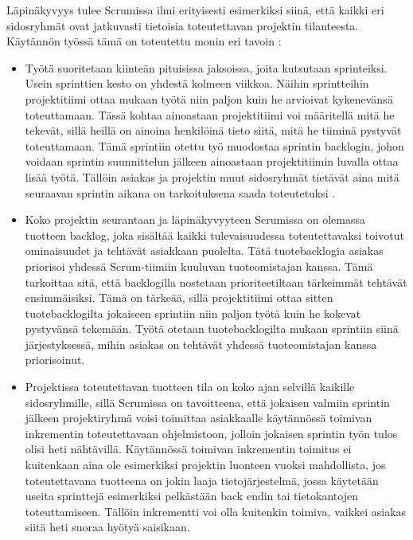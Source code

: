 \documentclass[finnish,nonumbib,nocopyright]{gradu2}
\begin{document}
Läpinäkyvyys tulee Scrumissa ilmi erityisesti esimerkiksi siinä, että kaikki eri sidosryhmät ovat jatkuvasti tietoisia toteutettavan projektin tilanteesta. Käytännön työssä tämä on toteutettu monin eri tavoin \cite{scrumguide}:

\begin{itemize}
\item Työtä suoritetaan kiinteän pituisissa jaksoissa, joita kutsutaan sprinteiksi. Usein sprinttien kesto on yhdestä kolmeen viikkoa. Näihin sprintteihin projektitiimi ottaa mukaan työtä niin paljon kuin he arvioivat kykenevänsä toteuttamaan. Tässä kohtaa ainoastaan projektitiimi voi määritellä mitä he tekevät, sillä heillä on ainoina henkilöinä tieto siitä, mitä he tiiminä pystyvät toteuttamaan. Tämä sprintiin otettu työ muodostaa sprintin backlogin, johon voidaan sprintin suunnittelun jälkeen ainoastaan projektitiimin luvalla ottaa lisää työtä. Tällöin asiakas ja projektin muut sidosryhmät tietävät aina mitä seuraavan sprintin aikana on tarkoituksena saada toteutetuksi \cite{scrumguide}.
\item Koko projektin seurantaan ja läpinäkyvyyteen Scrumissa on olemassa tuotteen backlog, joka sisältää kaikki tulevaisuudessa toteutettavaksi toivotut ominaisuudet ja tehtävät asiakkaan puolelta. Tätä tuotebacklogia asiakas priorisoi yhdessä Scrum-tiimiin kuuluvan tuoteomistajan kanssa. Tämä tarkoittaa sitä, että backlogilla nostetaan prioriteetiltaan tärkeimmät tehtävät ensimmäisiksi. Tämä on tärkeää, sillä projektitiimi ottaa sitten tuotebacklogilta jokaiseen sprintiin niin paljon työtä kuin he kokevat pystyvänsä tekemään. Työtä otetaan tuotebacklogilta mukaan sprintiin siinä järjestyksessä, mihin asiakas on tehtävät yhdessä tuoteomistajan kanssa priorisoinut.
\item Projektissa toteutettavan tuotteen tila on koko ajan selvillä kaikille sidosryhmille, sillä Scrumissa on tavoitteena, että jokaisen valmiin sprintin jälkeen projektiryhmä voisi toimittaa asiakkaalle käytännössä toimivan inkrementin toteutettavaan ohjelmistoon, jolloin jokaisen sprintin työn tulos olisi heti nähtävillä. Käytännössä toimivan inkrementin toimitus ei kuitenkaan aina ole esimerkiksi projektin luonteen vuoksi mahdollista, jos toteutettavana tuotteena on jokin laaja tietojärjestelmä, jossa käytetään useita sprinttejä esimerkiksi pelkästään back endin tai tietokantojen toteuttamiseen. Tällöin inkrementti voi olla kuitenkin toimiva, vaikkei asiakas siitä heti suoraa hyötyä saisikaan.
\end{itemize}
\end{document}
